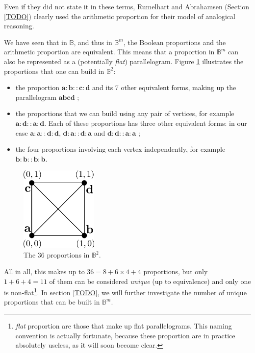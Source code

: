 Even if they did not state it in these terms, Rumelhart and Abrahamsen (Section
\ref{TODO}) clearly used the arithmetic proportion for their model of
analogical reasoning.

We have seen that in $\mathbb{B}$, and thus in $\mathbb{B}^m$, the Boolean
proportions and the arithmetic proportion are equivalent. This means that a
proportion in $\mathbb{B}^m$ can also be represented as a (potentially
\textit{flat}) parallelogram.
Figure \ref{FIG:proportions_in_B2} illustrates the proportions that one can
build in $\mathbb{B}^2$:
\begin{itemize}
  \item the proportion $\mathbf{a}: \mathbf{b} :: \mathbf{c} : \mathbf{d}$ and
    its 7 other equivalent forms, making up the parallelogram
    $\mathbf{a}\mathbf{b}\mathbf{c}\mathbf{d}$ ;
  \item the proportions that we can build using any pair of vertices, for
    example $\mathbf{a} : \mathbf{d} :: \mathbf{a} : \mathbf{d}$. Each of these
    proportions has three other equivalent forms: in our case $\mathbf{a} :
    \mathbf{a} :: \mathbf{d} : \mathbf{d}$, $\mathbf{d} : \mathbf{a} ::
    \mathbf{d} : \mathbf{a}$ and $\mathbf{d} : \mathbf{d} :: \mathbf{a} :
    \mathbf{a}$ ;
  \item the four proportions involving each vertex independently, for example
    $\mathbf{b}:\mathbf{b}::\mathbf{b}:\mathbf{b}$.
\end{itemize}

\begin{figure}[!h]
\centering
\includegraphics[width=1.5in]{figures/proportions_in_B2.pdf}
  \caption{The $36$ proportions in $\mathbb{B}^2$.}
\label{FIG:proportions_in_B2}
\end{figure}

All in all, this makes up to $36 = 8 + 6 \times 4 + 4$ proportions, but only $1
+ 6 + 4 = 11$ of them can be considered \textit{unique} (up to equivalence) and
only one is non-flat\footnote{\textit{flat} proportion are those that make up
flat parallelograms. This naming convention is actually fortunate, because
these proportion are in practice absolutely useless, as it will soon become
clear.}. In section \ref{TODO},
we will further investigate the number of unique proportions that can be built
in $\mathbb{B}^m$.

